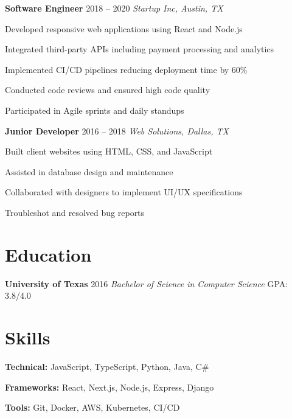 \documentclass[10pt]{article}
\begin{document}
\textbf{Software Engineer} \hfill 2018 -- 2020
\textit{Startup Inc, Austin, TX}

\begin{itemize*}
  \item Developed responsive web applications using React and Node.js
  \item Integrated third-party APIs including payment processing and analytics
  \item Implemented CI/CD pipelines reducing deployment time by 60\%
  \item Conducted code reviews and ensured high code quality
  \item Participated in Agile sprints and daily standups
\end{itemize*}

\textbf{Junior Developer} \hfill 2016 -- 2018
\textit{Web Solutions, Dallas, TX}

\begin{itemize*}
  \item Built client websites using HTML, CSS, and JavaScript
  \item Assisted in database design and maintenance
  \item Collaborated with designers to implement UI/UX specifications
  \item Troubleshot and resolved bug reports
\end{itemize*}

\section*{Education}

\textbf{University of Texas} \hfill 2016
\textit{Bachelor of Science in Computer Science} \hfill GPA: 3.8/4.0

\section*{Skills}

\begin{itemize*}
  \item \textbf{Technical:} JavaScript, TypeScript, Python, Java, C\#
  \item \textbf{Frameworks:} React, Next.js, Node.js, Express, Django
  \item \textbf{Tools:} Git, Docker, AWS, Kubernetes, CI/CD
\end{itemize*}
\end{document}
